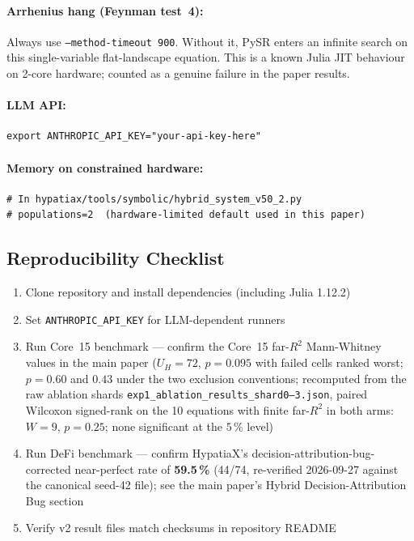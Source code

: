 \documentclass[twoside,11pt]{article}
\begin{document}
\paragraph{Arrhenius hang (Feynman test~4):}
Always use \texttt{--method-timeout 900}. Without it, PySR enters an
infinite search on this single-variable flat-landscape equation.
This is a known Julia JIT behaviour on 2-core hardware; counted as a
genuine failure in the paper results.

\paragraph{LLM API:}
\begin{small}
\begin{verbatim}
export ANTHROPIC_API_KEY="your-api-key-here"
\end{verbatim}
\end{small}

\paragraph{Memory on constrained hardware:}
\begin{small}
\begin{verbatim}
# In hypatiax/tools/symbolic/hybrid_system_v50_2.py
# populations=2  (hardware-limited default used in this paper)
\end{verbatim}
\end{small}

\subsection{Reproducibility Checklist}

\begin{enumerate}
\item Clone repository and install dependencies (including Julia 1.12.2)
\item Set \texttt{ANTHROPIC\_API\_KEY} for LLM-dependent runners
\item Run Core~15 benchmark — confirm the Core~15 far-$R^2$ Mann-Whitney values in the main paper ($U_H=72$, $p=0.095$ with failed cells ranked worst; $p=0.60$ and $0.43$ under the two exclusion conventions; recomputed from the raw ablation shards \texttt{exp1\_ablation\_results\_shard0--3.json}, paired Wilcoxon signed-rank on the 10 equations with finite far-$R^2$ in both arms: $W=9$, $p=0.25$; none significant at the $5\,\%$ level)
\item Run DeFi benchmark --- confirm HypatiaX's decision-attribution-bug-corrected
  near-perfect rate of \textbf{59.5\,\%} (44/74, re-verified
  2026-09-27 against the canonical seed-42 file); see the main paper's Hybrid
  Decision-Attribution Bug section
\item Verify v2 result files match checksums in repository README
\end{enumerate}
\end{document}
